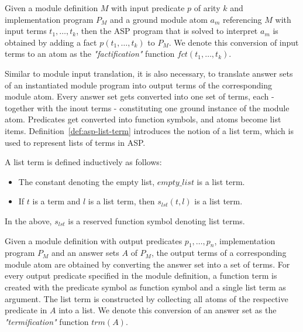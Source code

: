 \begin{definition}
\label{def:module-input-translation}
Given a module definition $M$ with input predicate $p$ of arity $k$ and implementation program $P_M$ and a ground module atom $a_m$ referencing $M$ with input terms $t_1,\ldots,t_k$, then the ASP program that is solved to interpret $a_m$ is obtained by adding a fact $p(t_1,\ldots,t_k)$ to $P_M$. We denote this conversion of input terms to an atom as the \emph{"factification"} function $\mathit{fct(t_1,\ldots,t_k)}$.
\end{definition}	

Similar to module input translation, it is also necessary, to translate answer sets of an instantiated module program into output terms of the corresponding module atom. Every answer set gets converted into one set of terms, each - together with the inout terms - constituting one ground instance of the module atom. Predicates get converted into function symbols, and atoms become list items. Definition~\ref{def:asp-list-term} introduces the notion of a list term, which is used to represent lists of terms in ASP.

\begin{definition}
\label{def:asp-list-term}
A list term is defined inductively as follows:
\begin{itemize}
		\item The constant denoting the empty list, $\mathit{empty\_list}$ is a list term.
		\item If $t$ is a term and $l$ is a list term, then $s_{lst}(t, l)$ is a list term.
\end{itemize}	
In the above, $s_{lst}$ is a reserved function symbol denoting list terms.
\end{definition}	


\begin{definition}
\label{def:module-output-translation}
Given a module definition with output predicates $p_1,\ldots,p_n$, implementation program $P_M$ and an  answer sets $A$ of $P_M$, the output terms of a corresponding module atom are obtained by converting the answer set into a set of terms. For every output predicate specified in the module definition, a function term is created with the predicate symbol as function symbol and a single list term as argument. The list term is constructed by collecting all atoms of the respective predicate in $A$ into a list.
We denote this conversion of an answer set as the \emph{"termification"} function $\mathit{trm(A)}$.
\end{definition}

